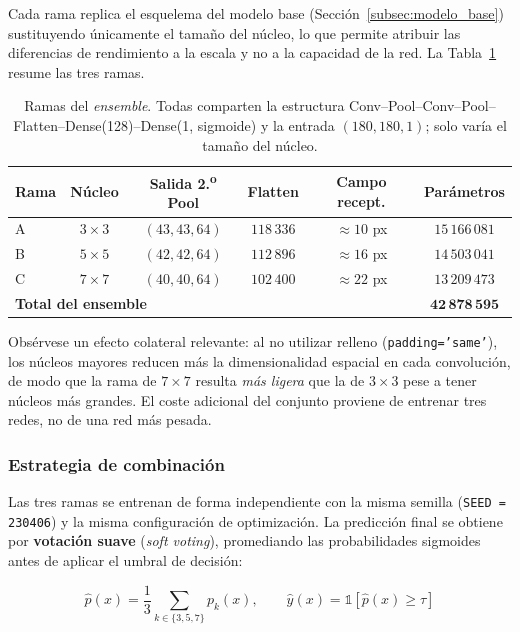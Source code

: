 \documentclass[11pt, a4paper]{article}
\numberwithin{equation}{section}
\begin{document}
Cada rama replica el esquelema del modelo base (Sección~\ref{subsec:modelo_base})
sustituyendo únicamente el tamaño del núcleo, lo que permite atribuir las diferencias
de rendimiento a la escala y no a la capacidad de la red. La Tabla~\ref{tab:ramas_kernel}
resume las tres ramas.

\begin{table}[H]
\centering
\caption{Ramas del \textit{ensemble}. Todas comparten la estructura
Conv--Pool--Conv--Pool--Flatten--Dense(128)--Dense(1, sigmoide) y la entrada
$(180,180,1)$; solo varía el tamaño del núcleo.}
\label{tab:ramas_kernel}
\footnotesize
\begin{tabular}{lccccc}
\toprule
\textbf{Rama} & \textbf{Núcleo} & \textbf{Salida 2.\textsuperscript{o} Pool} & \textbf{Flatten} & \textbf{Campo recept.} & \textbf{Parámetros} \\
\midrule
A & $3\times3$ & $(43, 43, 64)$ & $118\,336$ & $\approx 10$ px & $15\,166\,081$ \\
B & $5\times5$ & $(42, 42, 64)$ & $112\,896$ & $\approx 16$ px & $14\,503\,041$ \\
C & $7\times7$ & $(40, 40, 64)$ & $102\,400$ & $\approx 22$ px & $13\,209\,473$ \\
\midrule
\multicolumn{5}{l}{\textbf{Total del ensemble}} & $\mathbf{42\,878\,595}$ \\
\bottomrule
\end{tabular}
\end{table}

Obsérvese un efecto colateral relevante: al no utilizar relleno (\texttt{padding='same'}),
los núcleos mayores reducen más la dimensionalidad espacial en cada convolución, de modo
que la rama de $7\times7$ resulta \textit{más ligera} que la de $3\times3$ pese a tener
núcleos más grandes. El coste adicional del conjunto proviene de entrenar tres redes,
no de una red más pesada.

\subsubsection{Estrategia de combinación}

Las tres ramas se entrenan de forma independiente con la misma semilla
(\texttt{SEED = 230406}) y la misma configuración de optimización. La predicción final
se obtiene por \textbf{votación suave} (\textit{soft voting}), promediando las
probabilidades sigmoides antes de aplicar el umbral de decisión:

\begin{equation}
\hat{p}(x) = \frac{1}{3}\sum_{k \in \{3,5,7\}} p_k(x),
\qquad
\hat{y}(x) = \mathbb{1}\!\left[\hat{p}(x) \geq \tau\right]
\end{equation}
\end{document}
